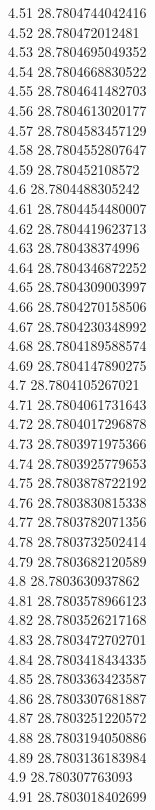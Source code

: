 {4.51	28.7804744042416\\
4.52	28.780472012481\\
4.53	28.7804695049352\\
4.54	28.7804668830522\\
4.55	28.7804641482703\\
4.56	28.7804613020177\\
4.57	28.7804583457129\\
4.58	28.7804552807647\\
4.59	28.780452108572\\
4.6	28.7804488305242\\
4.61	28.7804454480007\\
4.62	28.7804419623713\\
4.63	28.780438374996\\
4.64	28.7804346872252\\
4.65	28.7804309003997\\
4.66	28.7804270158506\\
4.67	28.7804230348992\\
4.68	28.7804189588574\\
4.69	28.7804147890275\\
4.7	28.7804105267021\\
4.71	28.7804061731643\\
4.72	28.7804017296878\\
4.73	28.7803971975366\\
4.74	28.7803925779653\\
4.75	28.7803878722192\\
4.76	28.7803830815338\\
4.77	28.7803782071356\\
4.78	28.7803732502414\\
4.79	28.7803682120589\\
4.8	28.7803630937862\\
4.81	28.7803578966123\\
4.82	28.7803526217168\\
4.83	28.7803472702701\\
4.84	28.7803418434335\\
4.85	28.7803363423587\\
4.86	28.7803307681887\\
4.87	28.7803251220572\\
4.88	28.7803194050886\\
4.89	28.7803136183984\\
4.9	28.780307763093\\
4.91	28.7803018402699\\
}
